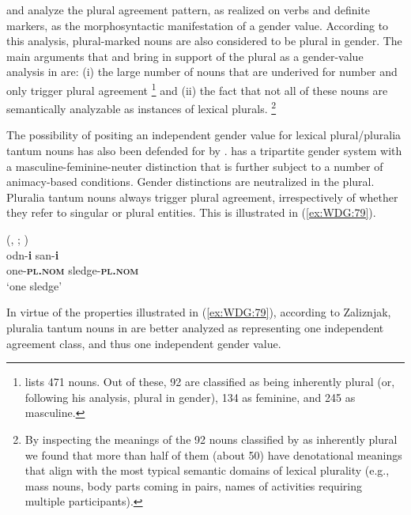 \documentclass[output=collectionpaper]{langsci/langscibook}
\begin{document}
\cite{Orkaydo2013} and \cite{Tsegaye2017} analyze the plural agreement pattern, as realized on verbs and definite markers, as the morphosyntactic manifestation of a gender value. According to this analysis, plural-marked nouns are also considered to be plural in gender. The main arguments that \cite{Orkaydo2013} and \cite{Tsegaye2017} bring in support of the plural as a gender-value analysis in  are: (i) the large number of nouns that are underived for number and only trigger plural agreement%
\footnote{%
\cite[318--330]{Orkaydo2013} lists 471  nouns. Out of these, 92 are classified as being inherently plural (or, following his analysis, plural in gender), 134 as feminine, and 245 as masculine.%
} %
and (ii) the fact that not all of these nouns are semantically analyzable as instances of lexical plurals.%
\footnote{%
By inspecting the meanings of the 92 nouns classified by \cite[318--330]{Orkaydo2013} as inherently plural we found that more than half of them (about 50) have denotational meanings that align with the most typical semantic domains of lexical plurality (e.g., mass nouns, body parts coming in pairs, names of activities requiring multiple participants).
}%

The possibility of positing an independent gender value for lexical plural\slash pluralia tantum nouns has also been defended for  by \cite{Zaliznjak1977}.  has a tripartite gender system with a masculine-feminine-neuter distinction that is further subject to a number of animacy-based conditions. Gender distinctions are neutralized in the plural. Pluralia tantum nouns always trigger plural agreement, irrespectively of whether they refer to singular or plural entities. This is illustrated in (\ref{ex:WDG:79}).

\ea\label{ex:WDG:79}
 (, ; \citealt[237]{Corbett2012}) \\
\gll odn-\textbf{i} 	san-\textbf{i}\\
one-\textbf{\textsc{pl.nom}} 	sledge-\textbf{\textsc{pl.nom}} \\
\glt `one sledge' \\
\z

\noindent In virtue of the properties illustrated in (\ref{ex:WDG:79}), according to Zaliznjak, pluralia tantum nouns in  are better analyzed as representing one independent agreement class, and thus one independent gender value.
\end{document}
